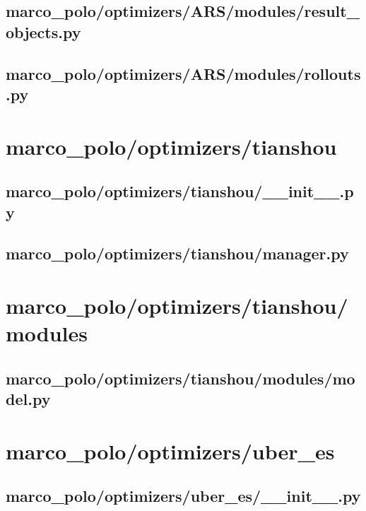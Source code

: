 \documentclass{article}
\begin{document}
\subsection[result\_objects.py]{marco\_polo/optimizers/ARS/modules/result\_objects.py}

\newpage

\subsection[rollouts.py]{marco\_polo/optimizers/ARS/modules/rollouts.py}

\newpage

\section{marco\_polo/optimizers/tianshou}
\subsection[\_\_init\_\_.py]{marco\_polo/optimizers/tianshou/\_\_init\_\_.py}

\newpage

\subsection[manager.py]{marco\_polo/optimizers/tianshou/manager.py}

\newpage

\section{marco\_polo/optimizers/tianshou/modules}
\subsection[model.py]{marco\_polo/optimizers/tianshou/modules/model.py}

\newpage

\section{marco\_polo/optimizers/uber\_es}
\subsection[\_\_init\_\_.py]{marco\_polo/optimizers/uber\_es/\_\_init\_\_.py}

\newpage
\end{document}
